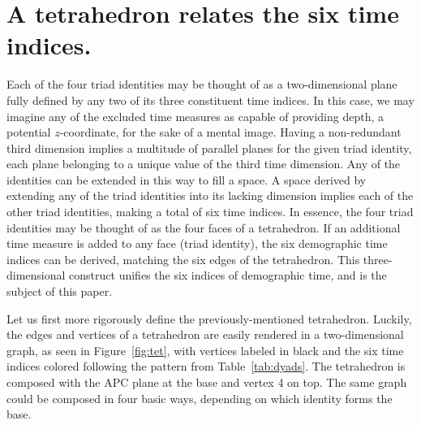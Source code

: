 \documentclass[12pt,oneside,a4paper]{article} %
\begin{document}
\FloatBarrier
\section{A tetrahedron relates the six time indices.}
Each of the four triad identities may be thought of as a
two-dimensional plane fully defined by any two of its three constituent time
indices.
In this case, we may imagine any of the excluded time measures as capable of
providing depth, a potential $z$-coordinate, for the sake of a mental image.
Having a non-redundant third dimension implies a multitude of parallel planes
for the given triad identity, each plane belonging to a unique value of the
third time dimension. Any of the identities can be extended in this way to fill a space. A space derived by
extending any of the triad identities into its lacking dimension implies each of
the other triad identities, making a total of six time indices. In essence, the
four triad identities may be thought of as the four faces of a
tetrahedron. If an additional time measure is added to any face (triad
identity), the six demographic time indices can be derived, matching the six edges of the tetrahedron. This three-dimensional construct unifies the six indices of demographic time, and is the subject of this paper.

Let us first more rigorously define the previously-mentioned tetrahedron.
Luckily, the edges and vertices of a tetrahedron are easily rendered in a
two-dimensional graph, as seen in Figure~\ref{fig:tet}, with vertices labeled
in black and the six time indices colored following the pattern from
Table~\ref{tab:dyads}. The tetrahedron is composed with the APC plane at the
base and vertex 4 on top. The same graph could be composed in four basic
ways, depending on which identity forms the base.
\end{document}
